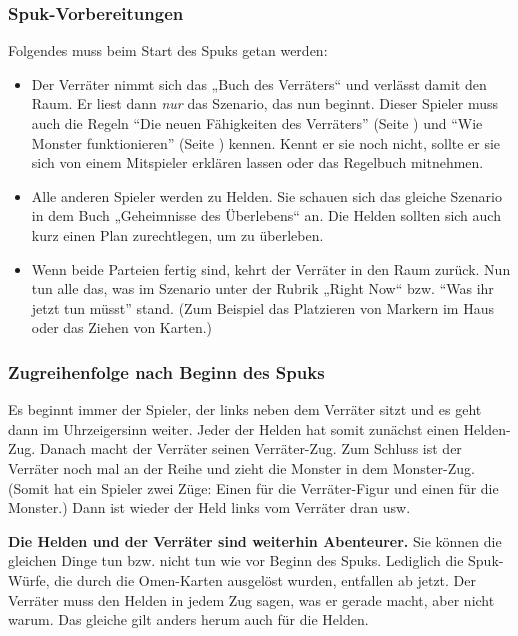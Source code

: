 \subsubsection{Spuk-Vorbereitungen}

Folgendes muss beim Start des Spuks getan werden:

\begin{itemize}
    \item Der Verräter nimmt sich das „Buch des Verräters“ und verlässt damit den Raum. Er liest dann \emph{nur} das Szenario, das nun beginnt. Dieser Spieler muss auch die Regeln ``Die neuen Fähigkeiten des Verräters'' (Seite \pageref{kap:rule:newtraitorpowers}) und ``Wie Monster funktionieren'' (Seite \pageref{kap:rules:monsters}) kennen. Kennt er sie noch nicht, sollte er sie sich von einem Mitspieler erklären lassen oder das Regelbuch mitnehmen.
    \item Alle anderen Spieler werden zu Helden. Sie schauen sich das gleiche Szenario in dem Buch „Geheimnisse des Überlebens“ an. Die Helden sollten sich auch kurz einen Plan zurechtlegen, um zu überleben.
    \item Wenn beide Parteien fertig sind, kehrt der Verräter in den Raum zurück. Nun tun alle das, was im Szenario unter der Rubrik „Right Now“ bzw. ``Was ihr jetzt tun müsst'' stand. (Zum Beispiel das Platzieren von Markern im Haus oder das Ziehen von Karten.)
\end{itemize}

\subsubsection{Zugreihenfolge nach Beginn des Spuks}

Es beginnt immer der Spieler, der links neben dem Verräter sitzt und es geht dann im Uhrzeigersinn weiter. Jeder der Helden hat somit zunächst einen Helden-Zug. Danach macht der Verräter seinen Verräter-Zug. Zum Schluss ist der Verräter noch mal an der Reihe und zieht die Monster in dem Monster-Zug. (Somit hat ein Spieler zwei Züge: Einen für die Verräter-Figur und einen für die Monster.) Dann ist wieder der Held links vom Verräter dran usw.

\textbf{Die Helden und der Verräter sind weiterhin Abenteurer.} Sie können die gleichen Dinge tun bzw. nicht tun wie vor Beginn des Spuks. Lediglich die Spuk-Würfe, die durch die Omen-Karten ausgelöst wurden, entfallen ab jetzt. Der Verräter muss den Helden in jedem Zug sagen, was er gerade macht, aber nicht warum. Das gleiche gilt anders herum auch für die Helden.

